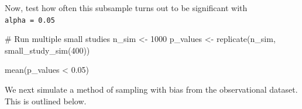 \documentclass[
  letterpaper,
  DIV=11,
  numbers=noendperiod]{scrartcl}
\newenvironment{Shaded}{\begin{snugshade}}{\end{snugshade}}
\newcommand{\AttributeTok}[1]{\textcolor[rgb]{0.40,0.45,0.13}{#1}}
\newcommand{\CommentTok}[1]{\textcolor[rgb]{0.37,0.37,0.37}{#1}}
\newcommand{\ControlFlowTok}[1]{\textcolor[rgb]{0.00,0.23,0.31}{\textbf{#1}}}
\newcommand{\DecValTok}[1]{\textcolor[rgb]{0.68,0.00,0.00}{#1}}
\newcommand{\FloatTok}[1]{\textcolor[rgb]{0.68,0.00,0.00}{#1}}
\newcommand{\FunctionTok}[1]{\textcolor[rgb]{0.28,0.35,0.67}{#1}}
\newcommand{\NormalTok}[1]{\textcolor[rgb]{0.00,0.23,0.31}{#1}}
\newcommand{\OtherTok}[1]{\textcolor[rgb]{0.00,0.23,0.31}{#1}}
\newcommand{\SpecialCharTok}[1]{\textcolor[rgb]{0.37,0.37,0.37}{#1}}
\begin{document}
\begin{Shaded}
\end{Shaded}

Now, test how often this subsample turns out to be significant with
\texttt{alpha\ =\ 0.05}

\begin{Shaded}
\begin{Highlighting}[]
\CommentTok{\# Run multiple small studies}
\NormalTok{n\_sim }\OtherTok{\textless{}{-}} \DecValTok{1000}
\NormalTok{p\_values }\OtherTok{\textless{}{-}} \FunctionTok{replicate}\NormalTok{(n\_sim, }\FunctionTok{small\_study\_sim}\NormalTok{(}\DecValTok{400}\NormalTok{))}

\FunctionTok{mean}\NormalTok{(p\_values }\SpecialCharTok{\textless{}} \FloatTok{0.05}\NormalTok{)}
\end{Highlighting}
\end{Shaded}

We next simulate a method of sampling with bias from the observational
dataset. This is outlined below.
\end{document}
